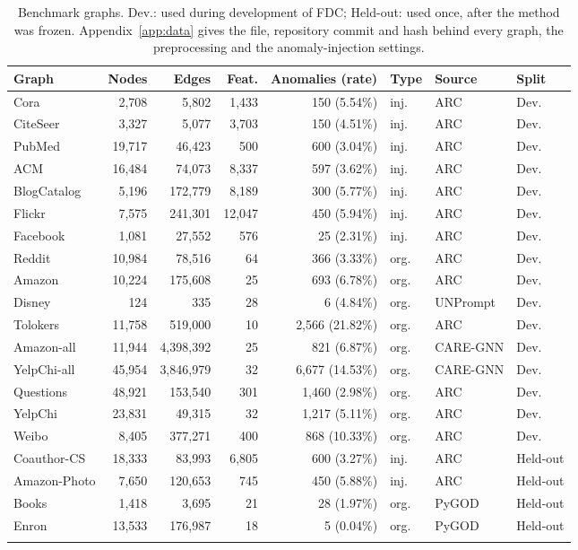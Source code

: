 \documentclass[pdflatex,sn-mathphys-ay]{sn-jnl}
\theoremstyle{plain}
\theoremstyle{remark}
\begin{document}
\begin{table}[!ht]
\caption{Benchmark graphs. Dev.: used during development of FDC; Held-out: used once, after the method was frozen. Appendix~\ref{app:data} gives the file, repository commit and hash behind every graph, the preprocessing and the anomaly-injection settings.}
\label{tab:datasets}
\footnotesize
\begin{tabular*}{\textwidth}{@{\extracolsep{\fill}}lrrrrlll@{}}
\toprule
Graph & Nodes & Edges & Feat. & Anomalies (rate) & Type & Source & Split \\
\midrule
Cora & 2,708 & 5,802 & 1,433 & 150 (5.54\%) & inj. & ARC & Dev. \\
CiteSeer & 3,327 & 5,077 & 3,703 & 150 (4.51\%) & inj. & ARC & Dev. \\
PubMed & 19,717 & 46,423 & 500 & 600 (3.04\%) & inj. & ARC & Dev. \\
ACM & 16,484 & 74,073 & 8,337 & 597 (3.62\%) & inj. & ARC & Dev. \\
BlogCatalog & 5,196 & 172,779 & 8,189 & 300 (5.77\%) & inj. & ARC & Dev. \\
Flickr & 7,575 & 241,301 & 12,047 & 450 (5.94\%) & inj. & ARC & Dev. \\
Facebook & 1,081 & 27,552 & 576 & 25 (2.31\%) & inj. & ARC & Dev. \\
Reddit & 10,984 & 78,516 & 64 & 366 (3.33\%) & org. & ARC & Dev. \\
Amazon & 10,224 & 175,608 & 25 & 693 (6.78\%) & org. & ARC & Dev. \\
Disney & 124 & 335 & 28 & 6 (4.84\%) & org. & UNPrompt & Dev. \\
Tolokers & 11,758 & 519,000 & 10 & 2,566 (21.82\%) & org. & ARC & Dev. \\
Amazon-all & 11,944 & 4,398,392 & 25 & 821 (6.87\%) & org. & CARE-GNN & Dev. \\
YelpChi-all & 45,954 & 3,846,979 & 32 & 6,677 (14.53\%) & org. & CARE-GNN & Dev. \\
Questions & 48,921 & 153,540 & 301 & 1,460 (2.98\%) & org. & ARC & Dev. \\
YelpChi & 23,831 & 49,315 & 32 & 1,217 (5.11\%) & org. & ARC & Dev. \\
Weibo & 8,405 & 377,271 & 400 & 868 (10.33\%) & org. & ARC & Dev. \\
\midrule
Coauthor-CS & 18,333 & 83,993 & 6,805 & 600 (3.27\%) & inj. & ARC & Held-out \\
Amazon-Photo & 7,650 & 120,653 & 745 & 450 (5.88\%) & inj. & ARC & Held-out \\
Books & 1,418 & 3,695 & 21 & 28 (1.97\%) & org. & PyGOD & Held-out \\
Enron & 13,533 & 176,987 & 18 & 5 (0.04\%) & org. & PyGOD & Held-out \\
\botrule
\end{tabular*}
\end{table}
\end{document}
